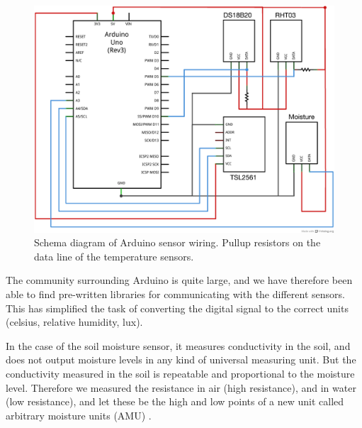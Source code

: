 
\begin{figure}
\centering
\includegraphics[width=1\textwidth]{img/hardware/Arduino_and_sensors_schem.png}
\caption{Schema diagram of Arduino sensor wiring. Pullup resistors on the data line of the temperature sensors.} %
\label{fig:Arduino}
\end{figure}

The community surrounding Arduino is quite large, and we have therefore been able to find pre-written libraries for communicating with the different sensors. This has simplified the task of converting the digital signal to the correct units (celsius, relative humidity, lux). 

In the case of the soil moisture sensor, it measures conductivity in the soil, and does not output moisture levels in any kind of universal measuring unit. But the conductivity measured in the soil is repeatable and proportional to the moisture level. Therefore we measured the resistance in air (high resistance), and in water (low resistance), and let these be the high and low points of a new unit called arbitrary moisture units (AMU) \citep{ch00ftech}.

